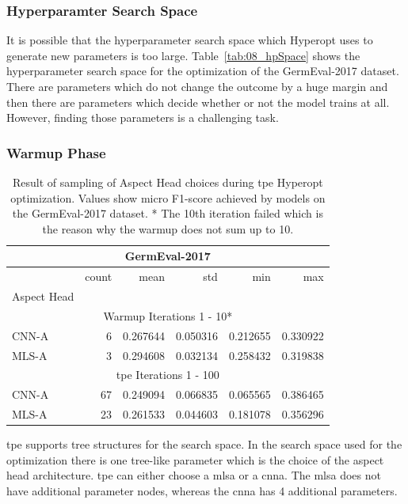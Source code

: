 \subsubsection*{Hyperparamter Search Space}

It is possible that the hyperparameter search space which Hyperopt uses to generate new parameters is too large. Table~\ref{tab:08_hpSpace} shows the hyperparameter search space for the optimization of the GermEval-2017 dataset. There are parameters which do not change the outcome by a huge margin and then there are parameters which decide whether or not the model trains at all. However, finding those parameters is a challenging task.

\subsubsection*{Warmup Phase}
\label{sec:06_hp_warmup}
\begin{table}[]
	\centering
	\begin{tabular}{lrrrrr}
	\multicolumn{6}{c}{GermEval-2017} \\

	\toprule
	{} &  count &      mean &       std &       min &       max \\
	Aspect Head &        &           &           &           &           \\
	\midrule
	\multicolumn{6}{c}{Warmup Iterations 1 - 10*} \\
	CNN-A    &    6 &  0.267644 &  0.050316 &  0.212655 &  0.330922 \\
	MLS-A    &    3 &  0.294608 &  0.032134 &  0.258432 &  0.319838 \\
	\midrule
	\multicolumn{6}{c}{\gls{tpe} Iterations 1 - 100} \\
	CNN-A    &   67 &  0.249094 &  0.066835 &  0.065565 &  0.386465 \\
	MLS-A    &   23 &  0.261533 &  0.044603 &  0.181078 &  0.356296 \\
	\bottomrule
	\end{tabular}
	\caption{Result of sampling of Aspect Head choices during \gls{tpe} Hyperopt optimization. Values show micro F1-score achieved by models on the GermEval-2017 dataset. * The 10th iteration failed which is the reason why the warmup does not sum up to 10.}
	\label{tab:08_hpAspectHeadsSpace}	
\end{table}

\gls{tpe} supports tree structures for the search space. In the search space used for the optimization there is one tree-like parameter which is the choice of the aspect head architecture. \gls{tpe} can either choose a \gls{mlsa} or a \gls{cnna}. The \gls{mlsa} does not have additional parameter nodes, whereas the \gls{cnna} has 4 additional parameters.
\medskip

